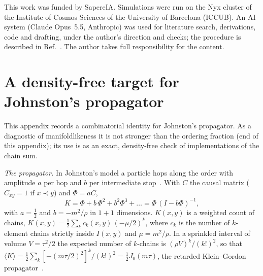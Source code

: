 \documentclass[prd,twocolumn,superscriptaddress,nofootinbib,amsmath,amssymb,floatfix]{revtex4-2}
\begin{document}
\begin{acknowledgments}
This work was funded by SapereIA. Simulations were run on the Nyx cluster of the Institute of Cosmos Sciences of the University of Barcelona (ICCUB). An AI system (Claude Opus~5.5, Anthropic) was used for literature search, derivations, code and drafting, under the author's direction and checks; the procedure is described in Ref.~\cite{MethodNote}. The author takes full responsibility for the content.
\end{acknowledgments}

\appendix
\section{A density-free target for Johnston's propagator}\label{app:prop}
This appendix records a combinatorial identity for Johnston's propagator. As a diagnostic of manifoldlikeness it is not stronger than the ordering fraction (end of this appendix); its use is as an exact, density-free check of implementations of the chain sum.

\emph{The propagator.} In Johnston's model a particle hops along the order with amplitude $a$ per hop and $b$ per intermediate stop~\cite{Johnston08}. With $C$ the causal matrix ($C_{xy}=1$ if $x\prec y$) and $\Phi=aC$,
\begin{equation}
K=\Phi+b\,\Phi^2+b^2\Phi^3+\dots=\Phi\,(I-b\Phi)^{-1},
\end{equation}
with $a=\tfrac12$ and $b=-m^2/\rho$ in $1+1$ dimensions. $K(x,y)$ is a weighted count of chains, $K(x,y)=\tfrac12\sum_k c_k(x,y)\,(-\mu/2)^k$, where $c_k$ is the number of $k$-element chains strictly inside $I(x,y)$ and $\mu=m^2/\rho$. In a sprinkled interval of volume $V=\tau^2/2$ the expected number of $k$-chains is $(\rho V)^k/(k!)^2$, so that $\langle K\rangle=\tfrac12\sum_k[-(m\tau/2)^2]^k/(k!)^2=\tfrac12J_0(m\tau)$, the retarded Klein--Gordon propagator~\cite{Johnston08}.
\end{document}
